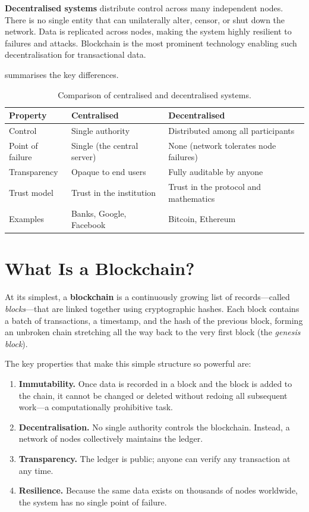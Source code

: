 \textbf{Decentralised systems} distribute control across many independent nodes. There is no single entity that can unilaterally alter, censor, or shut down the network.  Data is replicated across nodes, making the system highly resilient to failures and attacks.  Blockchain is the most prominent technology enabling such decentralisation for transactional data.

 summarises the key differences.

\begin{table}[htbp]
\centering
\renewcommand{\arraystretch}{1.3}
\begin{tabularx}{\textwidth}{l X X}
\toprule
\textbf{Property} & \textbf{Centralised} & \textbf{Decentralised} \\
\midrule
Control          & Single authority             & Distributed among all participants \\
Point of failure & Single (the central server)  & None (network tolerates node failures) \\
Transparency     & Opaque to end users          & Fully auditable by anyone \\
Trust model      & Trust in the institution     & Trust in the protocol and mathematics \\
Examples         & Banks, Google, Facebook      & Bitcoin, Ethereum \\
\bottomrule
\end{tabularx}
\caption{Comparison of centralised and decentralised systems.}
\label{tab:cent-vs-decent}
\end{table}

\section{What Is a Blockchain?}
\label{sec:what-is}

At its simplest, a \textbf{blockchain} is a continuously growing list of records---called \emph{blocks}---that are linked together using cryptographic hashes. Each block contains a batch of transactions, a timestamp, and the hash of the previous block, forming an unbroken chain stretching all the way back to the very first block (the \emph{genesis block}).

The key properties that make this simple structure so powerful are:

\begin{enumerate}
    \item \textbf{Immutability.} Once data is recorded in a block and the block is added to the chain, it cannot be changed or deleted without redoing all subsequent work---a computationally prohibitive task.
    \item \textbf{Decentralisation.} No single authority controls the blockchain. Instead, a network of nodes collectively maintains the ledger.
    \item \textbf{Transparency.} The ledger is public; anyone can verify any transaction at any time.
    \item \textbf{Resilience.} Because the same data exists on thousands of nodes worldwide, the system has no single point of failure.
\end{enumerate}

